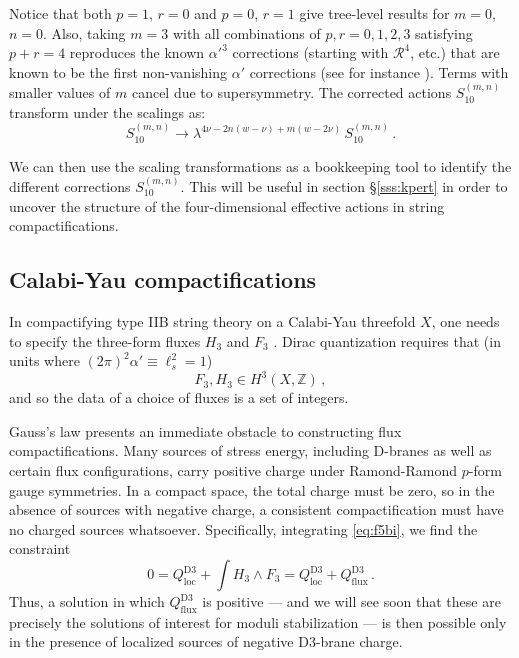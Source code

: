\documentclass[12pt,a4wide]{article}
\def\be{\begin{equation}}
\def\ee{\end{equation}}
\def\R{\mathcal{R}}
\begin{document}
Notice that both $p=1$, $r=0$ and $p=0$, $r=1$ give tree-level results for $m=0$, $n=0$. Also, taking $m=3$ with all combinations of $p,r=0,1,2,3$ satisfying $p+r=4$ reproduces the known $\alpha'^3$ corrections (starting with $\R^4$, etc.) that are known to be the first non-vanishing $\alpha'$ corrections (see for instance \cite{Policastro:2006vt,Policastro:2008hg,Liu:2022bfg}). Terms with smaller values of $m$ cancel due to supersymmetry. The corrected actions $S_{10}^{(m,n)}$ transform under the scalings as:
\be\label{mandn}
S_{10}^{(m,n)} \rightarrow \lambda^{4\nu-2n(w-\nu) +m (w-2\nu)} \, S_{10}^{(m,n)}\,.
\ee

We can then use the scaling transformations as a bookkeeping tool to identify the different corrections $S_{10}^{(m,n)}$. This will be useful in section \S\ref{sss:kpert} in order to uncover the structure of the four-dimensional effective actions in string compactifications.

\subsection{Calabi-Yau compactifications}\label{sec:cyc}

In compactifying type IIB string theory on a Calabi-Yau threefold $X$, one needs to specify the three-form fluxes $H_3$ and $F_3$ \cite{Dasgupta:1999ss, Giddings:2001yu}.  Dirac quantization requires that (in units where $(2\pi)^2\alpha' \equiv \ell_s^2 = 1$)
\begin{equation}
    F_3, H_3 \in H^3(X,\mathbb{Z})\,,
\end{equation} and so the data of a choice of fluxes is a set of integers.
 

Gauss's law presents an immediate obstacle to constructing flux compactifications.  Many sources of stress energy, including D-branes as well as certain flux configurations, carry positive charge under Ramond-Ramond $p$-form gauge symmetries.
In a compact space, the total charge must be zero, so in the absence of sources with negative charge, a consistent compactification must have no charged sources whatsoever.
Specifically, integrating \eqref{eq:f5bi}, we find the constraint
\begin{equation}\label{eq:gauss}
  0 =   Q_{\text{loc}}^{\text{D3}} + \int H_3 \wedge F_3 = Q_{\text{loc}}^{\text{D3}} + Q_{\text{flux}}^{\text{D3}}\,.
\end{equation}
Thus, a solution in which $Q_{\text{flux}}^{\text{D3}}$ is positive 
--- and we will see soon that these are precisely the solutions of interest for moduli stabilization --- is then possible only in the presence of localized sources of negative D3-brane charge.
\end{document}
